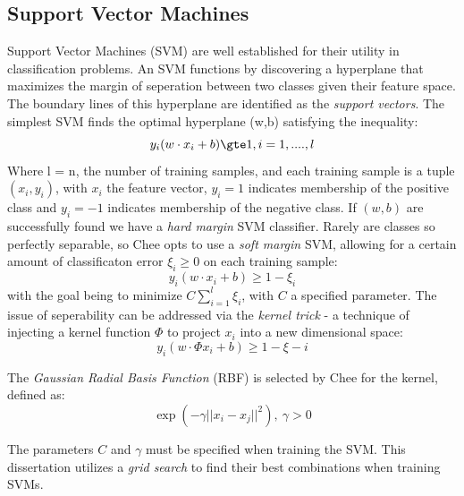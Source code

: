 \documentclass[twoside,11pt]{article}
\begin{document}
\subsection{Support Vector Machines}
Support Vector Machines (SVM) \citep{Cortes, Vapnik} are well established for their utility in classification problems. An SVM functions by discovering a hyperplane that maximizes the margin of seperation between two classes given their feature space. The boundary lines of this hyperplane are identified as the \textit{support vectors}. The simplest SVM finds the optimal hyperplane (w,b) satisfying the inequality:
\[
  y_{i}(w \cdot x_{i} + b) \gte 1,  i = 1, ...., l
\]
Where l = n, the number of training samples, and each training sample is a tuple $(x_{i}, y_{i})$, with $x_{i}$ the feature vector, $y_{i} = 1$ indicates membership of the positive class and $y_{i} = -1$ indicates membership of the negative class. If $(w, b)$ are successfully found we have a \textit{hard margin} SVM classifier. Rarely are classes so perfectly separable, so Chee opts to use a \textit{soft margin} SVM, allowing for a certain amount of classificaton error $\xi_{i} \geq 0$ on each training sample:
\[
  y_{i}(w \cdot x_{i} + b) \geq 1 - \xi_{i}
\]
with the goal being to minimize $C\sum_{i=1}^{l} \xi_{i}$, with $C$ a specified parameter. The issue of seperability can be addressed via the \textit{kernel trick} - a technique of injecting a kernel function $\Phi$ to project $x_{i}$ into a new dimensional space:
\[
  y_{i}(w \cdot \Phi{x_{i}} + b) \geq 1 - \xi-{i}
\]

The \textit{Gaussian Radial Basis Function} (RBF) is selected by Chee for the kernel, defined as:
\[
  \exp(-\gamma||x_{i} - x_{j}||^{2}),\ \gamma > 0
\]

The parameters $C$ and $\gamma$ must be specified when training the SVM. This dissertation utilizes a \textit{grid search} to find their best combinations when training SVMs.
\end{document}
